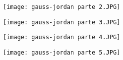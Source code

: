 \documentclass[10pts]{beamer}
\begin{document}
\begin{frame}{}
\begin{figure}
    \centering
    \texttt{[image: gauss-jordan parte 2.JPG]}
\end{figure}
\end{frame}
\begin{frame}{}
\begin{figure}
    \centering
    \texttt{[image: gauss-jordan parte 3.JPG]}
\end{figure}
\end{frame}
\begin{frame}{}
\begin{figure}
    \centering
    \texttt{[image: gauss-jordan parte 4.JPG]}
\end{figure}
\end{frame}
\begin{frame}{}
\begin{figure}
    \centering
    \texttt{[image: gauss-jordan parte 5.JPG]}
\end{figure}
\end{frame}



	
\end{document}
